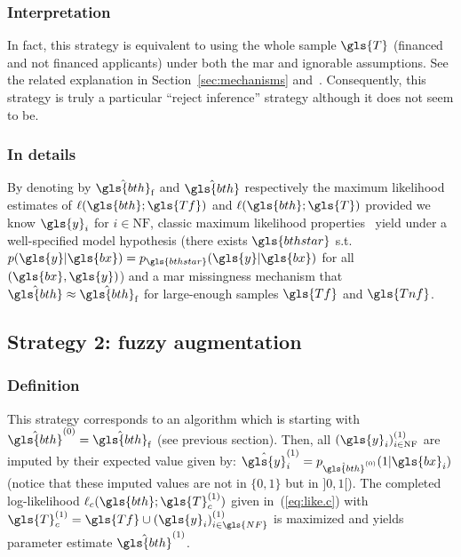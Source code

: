 \subsubsection{Interpretation}
In fact, this strategy is equivalent to using the whole sample $\gls{T}$ (financed and not financed applicants) under both the \gls{mar} and ignorable assumptions. See the related explanation in Section~\ref{sec:mechanisms} and~\cite{zadrozny2004learning}. Consequently, this strategy is truly a particular ``reject inference'' strategy although it does not seem to be.

\subsubsection{In details}
By denoting by $\hat{\gls{bth}}_\text{f}$ and $\hat{\gls{bth}}$ respectively the maximum likelihood estimates of $\ell(\gls{bth};\gls{Tf})$ and $\ell(\gls{bth};\gls{T})$ provided we know $\gls{y}_i$ for $i \in \text{NF}$, classic maximum likelihood properties~\cite{10.2307/1912526,zadrozny2004learning} yield under a well-specified model hypothesis (there exists $\gls{bthstar}$ s.t.\ $p(\gls{y} | \gls{bx}) = p_{\gls{bthstar}}(\gls{y} | \gls{bx})$ for all $(\gls{bx},\gls{y})$) and a \gls{mar} missingness mechanism that $\hat{\gls{bth}} \approx \hat{\gls{bth}}_\text{f}$ for large-enough samples $\gls{Tf}$ and $\gls{Tnf}$.



\subsection{Strategy 2: fuzzy augmentation}

\subsubsection{Definition}
This strategy corresponds to an algorithm which is starting with $\hat{\gls{bth}}^{(0)} = \hat{\gls{bth}}_\text{f}$ (see previous section). Then, all $(\gls{y}_i)^{(1)}_{i \in \text{NF}}$ are imputed by their expected value given by: $\hat{\gls{y}}^{(1)}_i = p_{\hat{\gls{bth}}^{(0)}}(1 | \gls{bx}_i)$ (notice that these imputed values are not in $\{0,1\}$ but in $]0,1[$). The completed log-likelihood $\ell_c(\gls{bth};\gls{T}_c^{(1)})$ given in~(\ref{eq:like.c}) with $\gls{T}_c^{(1)}=\gls{Tf} \cup (\gls{y}_i)^{(1)}_{i \in \gls{NF}}$ is maximized and yields parameter estimate $\hat{\gls{bth}}^{(1)}$.

